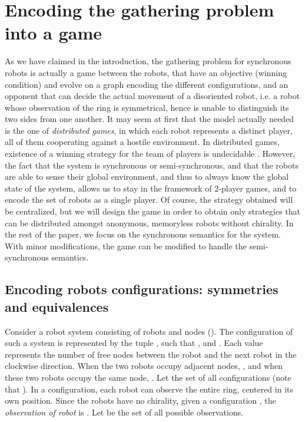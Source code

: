 \documentclass[envcountsame]{llncs} \usepackage[english]{babel}
\begin{document}
\section{Encoding the gathering problem into a game}\label{sec:game}
As we have claimed in the introduction, the gathering problem for synchronous robots is actually a game between the robots,
that have an objective (winning condition) and evolve on a graph encoding the different configurations, and an opponent that can decide
the actual movement of a disoriented robot, i.e. a robot whose observation of the ring is symmetrical, hence is unable to distinguish its
two sides from one another. It may seem at first
that the model actually needed is the one of \emph{distributed games}, in which each robot represents a distinct player, all of them cooperating against a hostile environment. In distributed games, existence of a winning strategy
for the team of players is undecidable \cite{PetersonReif79}. However, the fact that the system is synchronous or semi-synchronous,
and that the robots are able to sense their global environment, and thus to always know the global state of the system, allows us to
stay in the framework of 2-player games, and to encode the set of robots as a single player. 
Of course, the strategy obtained will
be centralized, but we will design the game in order to obtain only strategies that can be distributed amongst anonymous, memoryless robots without chirality.
In the rest of the paper, we focus on the synchronous semantics for the system. With minor modifications, the
game can be modified to handle the semi-synchronous semantics.



\subsection{Encoding robots configurations: symmetries and equivalences}
Consider a robot system consisting of  robots and  nodes ().
 The configuration of such a system is represented by the tuple , such that , 
and . 
Each value  represents the number of free nodes between the  robot and
the next robot in the clockwise direction. When the two robots occupy adjacent nodes, , and when 
these two robots occupy the same node, . Let  the set of all configurations (note that ). 
In a configuration, each robot can observe the entire ring, centered in
its own position. Since the robots have no chirality,  given a configuration , the 
\emph{observation of robot } is  . Let  be 
the set of all possible observations.
\end{document}
